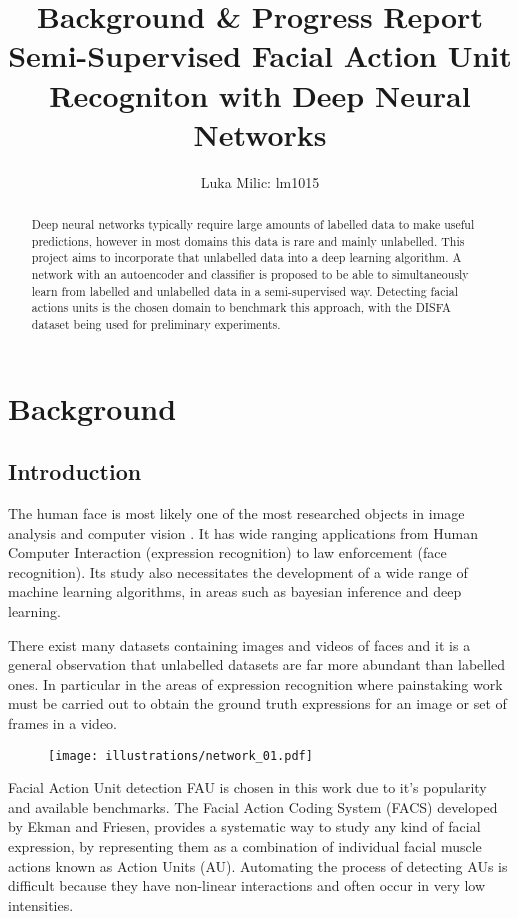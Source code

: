 \documentclass[9pt]{article} \usepackage{amsmath, amsthm, amssymb}
\title{{Background \& Progress Report}\\{\large Semi-Supervised Facial Action Unit Recogniton with Deep Neural Networks}}
\author{Luka Milic: lm1015}
\begin{document}
\maketitle

\begin{abstract}
    Deep neural networks typically require large amounts of labelled data to make useful
    predictions, however in most domains this data is rare and mainly unlabelled.
    This project aims to incorporate that unlabelled data into a deep learning algorithm.
    A network with an autoencoder and classifier is proposed to be able to simultaneously
    learn from labelled and unlabelled data in a semi-supervised way. Detecting
    facial actions units is the chosen domain to benchmark this approach, with
    the DISFA dataset being used for preliminary experiments.
\end{abstract}
%
%
%
\tableofcontents
\section{Background}
\subsection{Introduction}
The human face is most likely one of the most researched objects in image analysis
and computer vision \cite{S.ZafeiriouA.PapaioannouI.KotsiaM.A.Nicolaou}.
It has wide ranging applications from Human
Computer Interaction (expression recognition) to law enforcement (face recognition).
Its study also necessitates the development of a wide range of machine
learning algorithms, in areas such as bayesian inference and deep learning.

There exist many datasets containing images and videos of faces and it is a general
observation that unlabelled datasets are far more abundant than labelled ones.
In particular in the areas of expression recognition where painstaking work
must be carried out to obtain the ground truth expressions for an image or set of
frames in a video.

\begin{figure}
 \centering
 \texttt{[image: illustrations/network\_01.pdf]}
\end{figure}

Facial Action Unit detection FAU \cite{Corneanu2016} is chosen in this work due
to it's popularity and available benchmarks.
The Facial Action Coding System (FACS) developed by Ekman and Friesen,
provides a systematic way to study any kind of facial expression,
by representing them as a combination of individual facial muscle actions
known as Action Units (AU). Automating the process of detecting AUs is difficult
because they have non-linear interactions and often occur in very low intensities.
\end{document}
